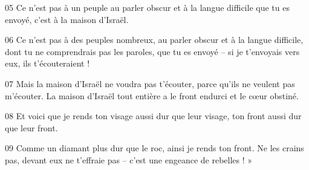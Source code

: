 
05 Ce n’est pas à un peuple au parler obscur et à la langue difficile que tu es envoyé, c’est à la maison d’Israël.

06 Ce n’est pas à des peuples nombreux, au parler obscur et à la langue difficile, dont tu ne comprendrais pas les paroles, que tu es envoyé – si je t’envoyais vers eux, ils t’écouteraient !

07 Mais la maison d’Israël ne voudra pas t’écouter, parce qu’ils ne veulent pas m’écouter. La maison d’Israël tout entière a le front endurci et le cœur obstiné.

08 Et voici que je rends ton visage aussi dur que leur visage, ton front aussi dur que leur front.

09 Comme un diamant plus dur que le roc, ainsi je rends ton front. Ne les crains pas, devant eux ne t’effraie pas – c’est une engeance de rebelles ! »
